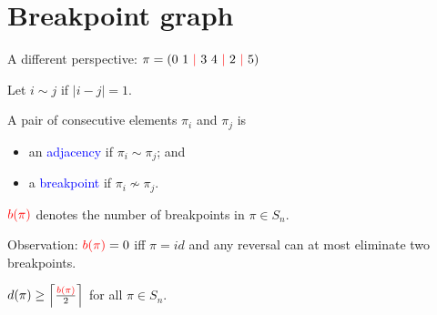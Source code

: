 \documentclass[handout]{beamer}
\theoremstyle{definition}
\newtheorem{algorithm}[theorem]{Algorithm}
\def\padding{\vspace{0.5cm}}
\def\spadding{\vspace{0.25cm}}
\def\b{\textcolor{blue}}
\def\r{\textcolor{red}}
\begin{document}




\section{Breakpoint graph}

\begin{frame}

A different perspective: $\pi = (0\ 1\ \r\mid\ 3\ 4\ \r\mid\ 2\ \r\mid\ 5)$\pause\spadding

\begin{definition}
Let $i \sim j$ if $|i - j| = 1$. \par
A pair of consecutive elements $\pi_i$ and $\pi_j$ is
\begin{itemize}
    \item an \b{adjacency} if $\pi_i \sim \pi_j$; and
    \item a \b{breakpoint} if $\pi_i \not\sim \pi_j$.
\end{itemize} \par\pause\spadding
$\r{b(\pi)}$ denotes the number of breakpoints in $\pi \in S_n$.
\end{definition}\pause\padding

Observation: $\r{b(\pi)} = 0$ iff $\pi = id$ \pause and any reversal can at most eliminate two breakpoints. \pause\spadding

\begin{corollary}
$d(\pi) \geq \left\lceil \frac{\r{b(\pi)}}{2} \right\rceil$ for all $\pi \in S_n$.
\end{corollary}

\end{frame}
\end{document}
